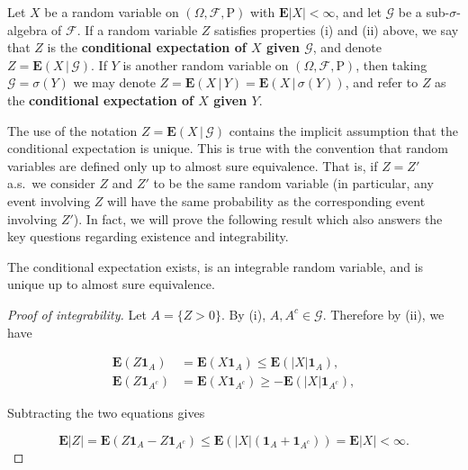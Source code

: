 \begin{defn}
Let $X$ be a random variable on
$(\Omega, \mathcal{F}, \mathrm{P})$ with
$\mathbf{E}|X|<\infty$, and let $\mathcal{G}$ be a
sub-$\sigma$-algebra of $\mathcal{F}$. If a random
variable $Z$ satisfies properties (i) and (ii) above,
we say that $Z$ is the \textbf{conditional expectation of $X$
given $\mathcal{G}$}, and denote
$Z = \mathbf{E}\left(X\,|\,\mathcal{G}\right)$. If $Y$
is another random variable on
$(\Omega, \mathcal{F}, \mathrm{P})$, then taking
$\mathcal{G}=\sigma(Y)$ we may denote
$Z = \mathbf{E}\left(X\,|\,Y\right) =
\mathbf{E}\left(X\,|\,\sigma(Y)\right)$,
and refer to $Z$ as the \textbf{conditional expectation of
$X$ given $Y$}.
\end{defn}

\noindent The use of the notation
$Z = \mathbf{E}\left(X\,|\,\mathcal{G}\right)$
contains the implicit assumption that the conditional
expectation is unique. This is true with the
convention that random variables are defined only up
to almost sure equivalence. That is, if $Z=Z'$ a.s.\
we consider $Z$ and $Z'$ to be the same random
variable (in particular, any event involving $Z$ will
have the same probability as the corresponding event
involving $Z'$). In fact, we will prove the following
result which also answers the key questions regarding
existence and integrability.

\begin{thm}
\label{thm-cond-ext}
The conditional expectation exists, is an integrable
random variable, and is unique up to almost sure
equivalence.
\end{thm}

\begin{proof}[Proof of integrability]
Let $A = \{ Z>0 \}$. By (i), $A, A^c \in \mathcal{G}$.
Therefore by (ii), we have

\begin{align*}
\mathbf{E}(Z \mathbf{1}_A) &= \mathbf{E}(X \mathbf{1}_A) \le \mathbf{E}\left( |X| \mathbf{1}_A \right), \\
\mathbf{E}(Z \mathbf{1}_{A^c}) &= \mathbf{E}(X \mathbf{1}_{A^c}) \ge -\mathbf{E}\left( |X| \mathbf{1}_{A^c} \right),
\end{align*}

\noindent Subtracting the two equations gives

\[
\mathbf{E}|Z| = \mathbf{E}(Z\mathbf{1}_A - Z\mathbf{1}_{A^c}) \le \mathbf{E}\left( |X| (\mathbf{1}_A + \mathbf{1}_{A^c}) \right) = \mathbf{E}|X| < \infty.
\]

\end{proof}

